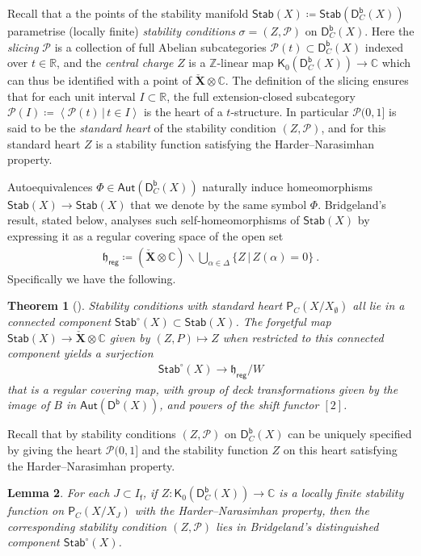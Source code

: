 \documentclass[reqno,a4paper]{amsart}
\newcommand{\calP}{\mathcal{P}}
\newcommand{\C}{\mathbb{C}}
\newcommand{\R}{\mathbb{R}}
\newcommand{\Z}{\mathbb{Z}}
\newcommand{\sfK}{\mathsf{K}}
\newcommand{\sff}{\mathsf{f}}
\newcommand{\frakh}{\mathfrak{h}}
\newcommand{\bfX}{\mathbf{X}}
\newcommand{\catPC}{\mathsf{P}_{C}}
\newcommand{\Stab}{\mathsf{Stab}}
\newcommand{\catDb}{\mathsf{D}^\mathsf{b}}
\newcommand{\catDbC}{\mathsf{D}^\mathsf{b}_C}
\newcommand{\weightlattice}{\bfX}
\newcommand{\coweightlattice}{\check{\weightlattice}}
\newcommand{\rsv}{X}
\newcommand{\ssv}{X_\emptyset}
\newcommand{\psv}{X_J}
\newcommand{\Aut}{\mathsf{Aut}}
\theoremstyle{basic-theorem}
\newtheorem{theorem}{Theorem}[section]
\newtheorem{lemma}[theorem]{Lemma}
\numberwithin{equation}{section}
\begin{document}
Recall that a the points of the stability manifold $\Stab(\rsv)\coloneqq \Stab(\catDbC(\rsv))$ parametrise (locally finite) \textit{stability conditions} $\sigma=(Z,\calP)$ on $\catDbC(\rsv)$. Here the \textit{slicing} $\calP$ is a collection of full Abelian subcategories $\calP(t)\subset \catDbC(\rsv)$ indexed over $t\in \R$, and the \textit{central charge} $Z$ is a $\Z$-linear map $\sfK_0(\catDbC(\rsv))\to \C$ which can thus be identified with a point of $\coweightlattice\otimes \C$. The definition of the slicing ensures that for each unit interval $I\subset \R$, the full extension-closed subcategory $\calP(I)\coloneqq\left\langle \calP(t)\,\vert\, t\in I\right\rangle$ is the heart of a $t$-structure. In particular $\calP(0,1]$ is said to be the \textit{standard heart} of the stability condition $(Z,\calP)$, and for this standard heart $Z$ is a stability function satisfying the Harder--Narasimhan property.

Autoequivalences $\Phi\in\Aut(\catDbC(\rsv))$ naturally induce homeomorphisms $\Stab(\rsv)\to \Stab(\rsv)$ that we denote by the same symbol $\Phi$. Bridgeland's result, stated below, analyses such self-homeomorphisms of $\Stab(\rsv)$ by expressing it as a regular covering space of the open set
\begin{align}
	\frakh_\mathsf{reg}\coloneqq(\coweightlattice\otimes \C) \smallsetminus \bigcup_{\alpha\in \Delta}\{Z\,\vert\, Z(\alpha)=0\}\ .
\end{align}
Specifically we have the following.
\begin{theorem}[{\cite[Theorem~1.3]{Stab_Kleinian}}]\label{thm:Bridgelandcovering}
    Stability conditions with standard heart $\catPC(\rsv/\ssv)$ all lie in a connected component $\Stab^\circ(\rsv)\subset \Stab(\rsv)$. The forgetful map $\Stab(\rsv)\to \coweightlattice\otimes\C$ given by $(Z,P)\mapsto Z$ when restricted to this connected component yields a surjection
    \begin{align}
        \label{eqn:bridgelandmap}
        \Stab^\circ(\rsv)\longrightarrow \frakh_\mathsf{reg}/W
    \end{align}
    that is a regular covering map, with group of deck transformations given by the image of $B$ in $\Aut(\catDb(\rsv))$, and powers of the shift functor $[2]$.
\end{theorem}

Recall that by \cite[Proposition~5.3]{B07} stability conditions $(Z,\calP)$ on $\catDbC(\rsv)$ can be uniquely specified by giving the heart $\calP(0,1]$ and the stability function $Z$ on this heart satisfying the Harder--Narasimhan property.
\begin{lemma}
    For each $J\subset I_\sff$, if $Z:\sfK_0(\catDbC(\rsv))\to \C$ is a locally finite stability function on $\catPC(\rsv/\psv)$ with the Harder--Narasimhan property, then the corresponding stability condition $(Z,\calP)$ lies in Bridgeland's distinguished component $\Stab^\circ(\rsv)$.
\end{lemma}
\end{document}
